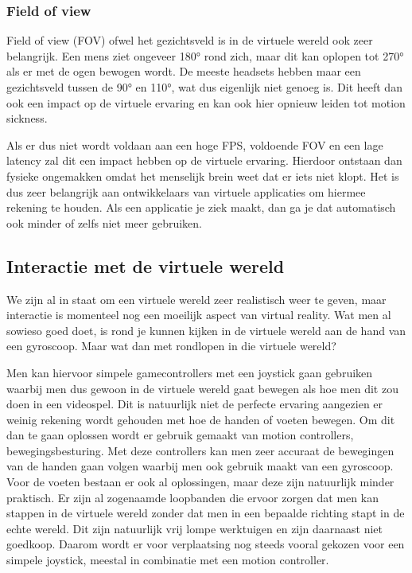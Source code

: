\subsubsection{Field of view}
\label{ssubsec:fov}
Field of view (FOV) ofwel het gezichtsveld is in de virtuele wereld ook zeer belangrijk. Een mens ziet ongeveer 180° rond zich, maar dit kan oplopen tot 270° als er met de ogen bewogen wordt. De meeste headsets hebben maar een gezichtsveld tussen de 90° en 110°, wat dus eigenlijk niet genoeg is. Dit heeft dan ook een impact op de virtuele ervaring en kan ook hier opnieuw leiden tot motion sickness.

Als er dus niet wordt voldaan aan een hoge FPS, voldoende FOV en een lage latency zal dit  een impact hebben op de virtuele ervaring. Hierdoor ontstaan dan fysieke ongemakken omdat het menselijk brein weet dat er iets niet klopt. Het is dus zeer belangrijk aan ontwikkelaars van virtuele applicaties om hiermee rekening te houden. Als een applicatie je ziek maakt, dan ga je dat automatisch ook minder of zelfs niet meer gebruiken.

\subsection{Interactie met de virtuele wereld}
\label{subsec:interactie-vr}
We  zijn al in staat om een virtuele wereld zeer realistisch weer te geven, maar interactie is momenteel nog een moeilijk aspect van virtual reality. Wat men al sowieso goed doet, is rond je kunnen kijken in de virtuele wereld aan de hand van een gyroscoop. Maar wat dan met rondlopen in die virtuele wereld?

Men kan hiervoor simpele gamecontrollers met een joystick gaan gebruiken waarbij men dus gewoon in de virtuele wereld gaat bewegen als hoe men dit zou doen in een videospel. Dit is natuurlijk niet de perfecte ervaring aangezien er weinig rekening wordt gehouden met hoe de handen of voeten bewegen. Om dit dan te gaan oplossen wordt er gebruik gemaakt van motion controllers, bewegingsbesturing. Met deze controllers kan men zeer accuraat de bewegingen van de handen gaan volgen waarbij men ook gebruik maakt van een gyroscoop. Voor de voeten bestaan er ook al oplossingen, maar deze zijn natuurlijk minder praktisch. Er zijn al zogenaamde loopbanden die ervoor zorgen dat men kan stappen in de virtuele wereld zonder dat men in een bepaalde richting stapt in de echte wereld. Dit zijn natuurlijk vrij lompe werktuigen en zijn daarnaast niet goedkoop. Daarom wordt er voor verplaatsing nog steeds vooral gekozen voor een simpele joystick, meestal in combinatie met een motion controller.

